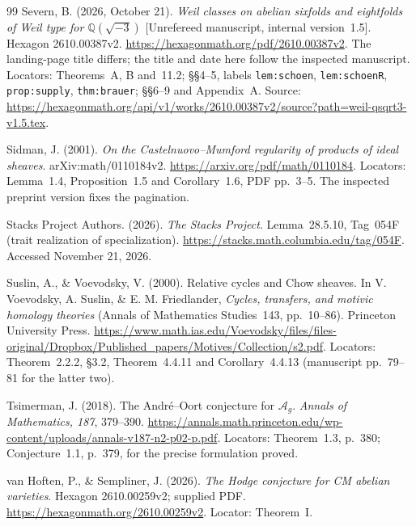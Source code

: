 \documentclass[11pt,a4paper]{article}
\theoremstyle{definition}\newtheorem{definition}[theorem]{Definition}
\theoremstyle{remark}\newtheorem{remark}[theorem]{Remark}
\newcommand{\Q}{\mathbb Q}\newcommand{\Z}{\mathbb Z}\newcommand{\C}{\mathbb C}\newcommand{\R}{\mathbb R}
\begin{document}
\begin{thebibliography}{99}
Severn, B. (2026, October 21). \emph{Weil classes on abelian sixfolds and eightfolds of Weil type for $\Q(\sqrt{-3})$} [Unrefereed manuscript, internal version~1.5]. Hexagon 2610.00387v2. \url{https://hexagonmath.org/pdf/2610.00387v2}. The landing-page title differs; the title and date here follow the inspected manuscript. Locators: Theorems~A, B and~11.2; \S\S4--5, labels \texttt{lem:schoen}, \texttt{lem:schoenR}, \texttt{prop:supply}, \texttt{thm:brauer}; \S\S6--9 and Appendix~A. Source: \url{https://hexagonmath.org/api/v1/works/2610.00387v2/source?path=weil-qsqrt3-v1.5.tex}.

Sidman, J. (2001). \emph{On the Castelnuovo--Mumford regularity of products of ideal sheaves}. arXiv:math/0110184v2. \url{https://arxiv.org/pdf/math/0110184}. Locators: Lemma~1.4, Proposition~1.5 and Corollary~1.6, PDF pp.~3--5. The inspected preprint version fixes the pagination.

Stacks Project Authors. (2026). \emph{The Stacks Project}. Lemma~28.5.10, Tag~054F (trait realization of specialization). \url{https://stacks.math.columbia.edu/tag/054F}. Accessed November 21, 2026.

Suslin, A., \& Voevodsky, V. (2000). Relative cycles and Chow sheaves. In V. Voevodsky, A. Suslin, \& E. M. Friedlander, \emph{Cycles, transfers, and motivic homology theories} (Annals of Mathematics Studies~143, pp.~10--86). Princeton University Press. \url{https://www.math.ias.edu/Voevodsky/files/files-original/Dropbox/Published_papers/Motives/Collection/s2.pdf}. Locators: Theorem~2.2.2, \S3.2, Theorem~4.4.11 and Corollary~4.4.13 (manuscript pp.~79--81 for the latter two).

Tsimerman, J. (2018). The Andr\'e--Oort conjecture for $\mathcal A_g$. \emph{Annals of Mathematics, 187}, 379--390. \url{https://annals.math.princeton.edu/wp-content/uploads/annals-v187-n2-p02-p.pdf}. Locators: Theorem~1.3, p.~380; Conjecture~1.1, p.~379, for the precise formulation proved.

van Hoften, P., \& Sempliner, J. (2026). \emph{The Hodge conjecture for CM abelian varieties}. Hexagon 2610.00259v2; supplied PDF. \url{https://hexagonmath.org/2610.00259v2}. Locator: Theorem~I.
\end{thebibliography}



\end{document}
